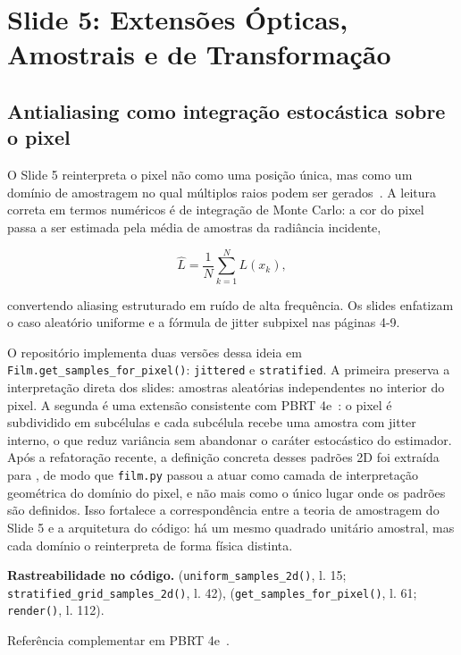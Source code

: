 \documentclass[portuguese]{sbcreviews-2025}%
\newcommand{\slidescite}[2]{\citep[pp.~#2]{#1}}
\newcommand{\pbrtsec}[1]{PBRT 4e~\citep[Se\c{c}\~ao~#1]{pharr2023pbrt}}
\newcommand{\pbrtsecs}[1]{PBRT 4e~\citep[Se\c{c}\~oes~#1]{pharr2023pbrt}}
\begin{document}
\section{Slide 5: Extensões Ópticas, Amostrais e de Transformação}
\label{sec:slide5}

\subsection{Antialiasing como integração estocástica sobre o pixel}
\label{sec:slide5-antialiasing}

O Slide 5 reinterpreta o pixel não como uma posição única, mas como um domínio de amostragem no qual múltiplos raios podem ser gerados~\slidescite{inf2608slides05}{4--8}. A leitura correta em termos numéricos é de integração de Monte Carlo: a cor do pixel passa a ser estimada pela média de amostras da radiância incidente,

\[
\hat L = \frac{1}{N}\sum_{k=1}^{N} L(x_k),
\]

convertendo aliasing estruturado em ruído de alta frequência. Os slides enfatizam o caso aleatório uniforme e a fórmula de jitter subpixel nas páginas 4-9.

O repositório implementa duas versões dessa ideia em \texttt{Film.get\_samples\_for\_pixel()}: \texttt{jittered} e \texttt{stratified}. A primeira preserva a interpretação direta dos slides: amostras aleatórias independentes no interior do pixel. A segunda é uma extensão consistente com \pbrtsec{8.5}: o pixel é subdividido em subcélulas e cada subcélula recebe uma amostra com jitter interno, o que reduz variância sem abandonar o caráter estocástico do estimador. Após a refatoração recente, a definição concreta desses padrões 2D foi extraída para , de modo que \texttt{film.py} passou a atuar como camada de interpretação geométrica do domínio do pixel, e não mais como o único lugar onde os padrões são definidos. Isso fortalece a correspondência entre a teoria de amostragem do Slide 5 e a arquitetura do código: há um mesmo quadrado unitário amostral, mas cada domínio o reinterpreta de forma física distinta.

\noindent\textbf{Rastreabilidade no código.}  (\texttt{uniform\_samples\_2d()}, l. 15; \texttt{stratified\_grid\_samples\_2d()}, l. 42),  (\texttt{get\_samples\_for\_pixel()}, l. 61; \texttt{render()}, l. 112).

Referência complementar em \pbrtsecs{8.1 e 8.5}.
\end{document}
